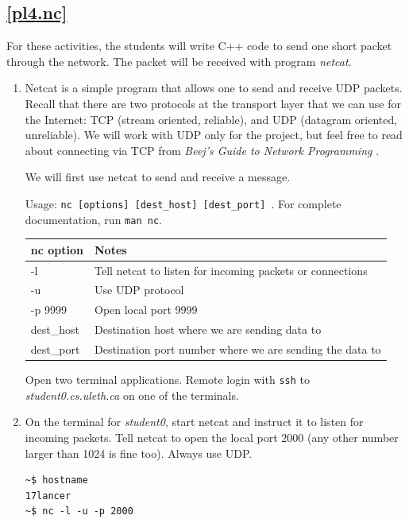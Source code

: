 \documentclass[12pt]{book}
\begin{document}
\subsection{\ref{pl4.nc}}

For these activities, the students will write C++ code to send one short packet through the network. The packet will be received with program \emph{netcat}. 

\begin{enumerate}[label=Activity \arabic*:]
\item Netcat is a simple program that allows one to send and receive UDP packets. Recall that there are two protocols at the transport layer that we can use for the Internet: TCP (stream oriented, reliable), and UDP (datagram oriented, unreliable). We will work with UDP only for the project, but feel free to read about connecting via TCP from \emph{Beej's Guide to Network Programming} \cite{hall2009beej}.

  We will first use netcat to send and receive a message.

  Usage: \verb$nc [options] [dest_host] [dest_port] $. For complete documentation, run \verb$man nc$.

  \begin{tabular}{l p{11cm}}
    \toprule
    nc option & Notes \\
    \midrule
    -l & Tell netcat to listen for incoming packets or connections \\
    -u & Use UDP protocol \\
    -p 9999 & Open local port 9999 \\
    dest\_host & Destination host where we are sending data to \\
    dest\_port & Destination port number where we are sending the data to \\
    \bottomrule
  \end{tabular}

  Open two terminal applications. Remote login with \verb$ssh$ to \emph{student0.cs.uleth.ca} on one of the terminals.

\item On the terminal for \emph{student0}, start netcat and instruct it to listen for incoming packets. Tell netcat to open the local port 2000 (any other number larger than 1024 is fine too). Always use UDP.

  \begin{lstlisting}
~$ hostname
17lancer
~$ nc -l -u -p 2000   
  \end{lstlisting}


\end{enumerate}
\end{document}
